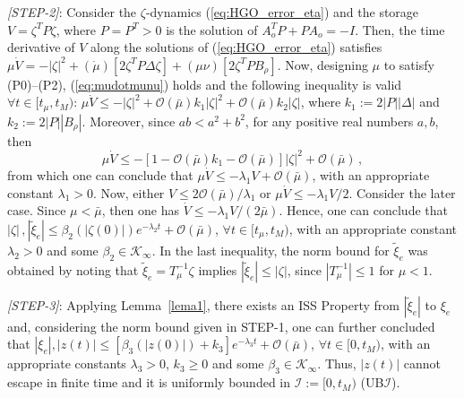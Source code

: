 \documentclass{rncauth}
\begin{document}
{\em [STEP-2]}: Consider the $\zeta$-dynamics
(\ref{eq:HGO_error_eta}) and the storage $V=\zeta^T P \zeta$,
where $P=P^T>0$ is the solution of $A_o^T P + P A_o=-I$. Then, the
time derivative of $V$ along the solutions of
(\ref{eq:HGO_error_eta}) satisfies
%
$\mu \dot{V} = - |\zeta|^2 + (\dot{\mu}) [2 \zeta^T P \Delta
\zeta] + (\mu \nu) [2 \zeta^T P B_\rho]$.
%
Now, designing $\mu$ to satisfy (P0)--(P2), (\ref{eq:mudotmunu})
holds and the following inequality is valid $\forall
t \in
[t_\mu,t_M)$:
%
$\mu \dot{V} \leq - |\zeta|^2 + \mathcal{O}(\bar{\mu}) k_1
|\zeta|^2 + \mathcal{O}(\bar{\mu})k_2 |\zeta|$,
%
where $k_1:=2|P||\Delta|$ and $k_2:=2 |P| |B_\rho|$. Moreover,
since $ab < a^2 + b^2$, for any positive real numbers $a,b$, then
%
$$\mu \dot{V} \leq - [1 - \mathcal{O}(\bar{\mu}) k_1-\mathcal{O}(\bar{\mu}) ] |\zeta|^2
+\mathcal{O}(\bar{\mu})\,,$$
%
from which one can conclude that $\mu \dot{V} \leq -\lambda_1 V +
\mathcal{O}(\bar{\mu})$, with an appropriate constant
$\lambda_1>0$. Now, either
$V\leq2\mathcal{O}(\bar{\mu})/\lambda_1$ or $\mu \dot{V} \leq
-\lambda_1 V/2$. Consider the later case. Since $\mu<\bar{\mu}$,
then one has $\dot{V} \leq -\lambda_1V/(2\bar{\mu})$. Hence, one
can conclude that $|\zeta|\,,|\tilde{\xi}_e| \leq
\beta_2(|\zeta(0)|) e^{-\lambda_2 t} + \mathcal{O}(\bar{\mu})$,
$\forall t \in [t_\mu,t_M)$, with an appropriate constant
$\lambda_2>0$ and some $\beta_2 \in \mathcal{K}_\infty$. In the
last inequality, the norm bound for $\tilde{\xi}_e$ was obtained
by noting that $\tilde{\xi}_e\!=\!T_\mu^{-1} \zeta$ implies
$|\tilde{\xi}_e| \!\leq\! |\zeta|$, since $|T_\mu^{-1}|\!\leq\!1$
for $\mu\!<\!1$.








{\em [STEP-3]}: Applying Lemma~\ref{lema1}, there exists an ISS
Property from $|\tilde{\xi}_e|$ to $\xi_e$ and, considering the
norm bound given in STEP-1, one can further concluded that
$|\xi_e|,|z(t)| \leq [\beta_3(|z(0)|)+k_3] e^{-\lambda_3
t}+\mathcal{O}(\bar{\mu})$, $\forall t \in [0,t_M)$, with an
appropriate constants $\lambda_3>0$, $k_3\geq0$ and some $\beta_3
\in \mathcal{K}_\infty$. Thus, $|z(t)|$ cannot escape in finite
time and it is uniformly bounded in $\mathcal{I}:=[0,t_M)$
(UB$\mathcal{I}$).


\end{document}
